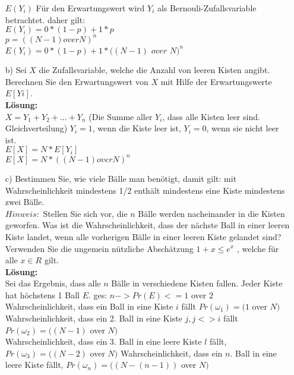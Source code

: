 \begin{enumerate}
\noindent
$E(Y_i)$ Für den Erwartungswert wird $Y_i$ als Bernouli-Zufallsvariable betrachtet. daher gilt:\\
$E(Y_i) = 0*(1-p)+1*p$\\ 
$p = ((N-1) over N)^n$\\
$E(Y_i) = 0*(1-p) + 1* ((N-1)$ $over$ $N)^n$\\


\item[b)] Sei $X$ die Zufallsvariable, welche die Anzahl von leeren Kisten angibt. Berechnen Sie den Erwartungswert von $X$ mit Hilfe der Erwartungswerte $E[Yi]$.\\

\textbf{Lösung:}\\
$X = Y_1 + Y_2 + ... + Y_n$ (Die Summe aller $Y_i$, dass alle Kisten leer sind. Gleichverteilung) $Y_i = 1$, wenn die Kiste leer ist, $Y_i = 0$, wenn sie nicht leer ist.\\
$E[X] = N*E[Y_i]$\\
$E[X] = N*((N-1) over N)^n$\\

\item[c)] Bestimmen Sie, wie viele Bälle man benötigt, damit gilt: mit Wahrscheinlichkeit mindestens 1/2 enthält mindestens eine Kiste mindestens zwei Bälle.\\ 
$Hinweis:$ Stellen Sie sich vor, die $n$ Bälle werden nacheinander in die Kisten
geworfen. Was ist die Wahrscheinlichkeit, dass der nächste Ball in einer leeren Kiste landet, wenn alle vorherigen Bälle in einer leeren Kiste gelandet sind? Verwenden Sie die ungemein nützliche Abschätzung $1 + x \leq e^x$ , welche für alle $x \in R$ gilt.\\

\textbf{Lösung:}\\
Sei das Ergebnis, dass alle $n$ Bälle in verschiedene Kisten fallen. Jeder Kiste hat höchstens 1 Ball $E$. ges: $n -> Pr(E) <= 1$ over $2$\\
Wahrscheinlichkeit, dass ein Ball in eine Kiste $i$ fällt $Pr(\omega_1) = (1$ over $N)$\\
Wahrscheinlichkeit, dass ein 2. Ball in eine Kiste $j, j <> i$ fällt $Pr(\omega_2) = ((N-1)$ over $N)$\\
Wahrscheinlichkeit, dass ein 3. Ball in eine leere Kiste $l$ fällt, $Pr(\omega_3) = ((N-2)$ over $N)$
Wahrscheinlichkeit, dass ein $n$. Ball in eine leere Kiste fällt, $Pr(\omega_n) = ((N-(n-1))$ over $N)$\\


\end{enumerate}
